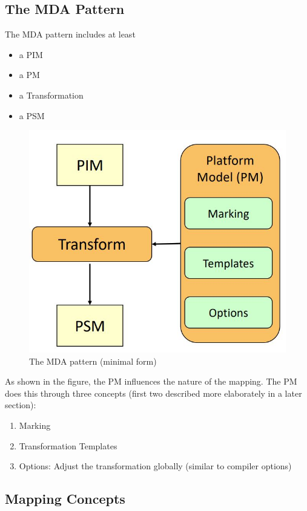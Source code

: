 		\pagebreak
		
		\subsection{The MDA Pattern}
			The MDA pattern includes at least
			\begin{itemize}
				\item a PIM
				\item a PM
				\item a Transformation
				\item a PSM
			\end{itemize}
			\begin{figure}[h!]
				\includegraphics[scale=0.5]{res/mda-pattern.jpg}
				\caption{The MDA pattern (minimal form)}
			\end{figure}
			As shown in the figure, the PM influences the nature of the mapping. The PM does this through three concepts (first two described more elaborately in a later section):
			\begin{enumerate}
				\item Marking
				\item Transformation Templates
				\item Options: Adjust the transformation globally (similar to compiler options)\\
			\end{enumerate}
		
		
		\subsection{Mapping Concepts}

